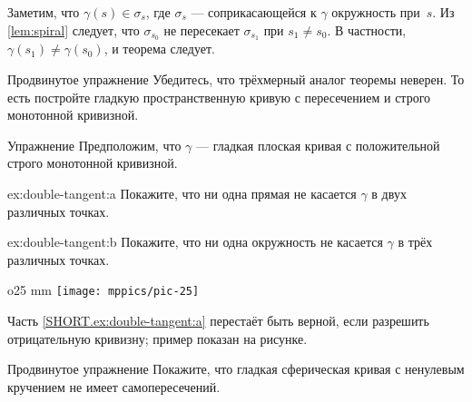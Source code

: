 Заметим, что $\gamma(s)\in \sigma_s$, где  $\sigma_s$ --- соприкасающейся к $\gamma$ окружность при~$s$.
Из \ref{lem:spiral} следует, что $\sigma_{s_0}$ не пересекает $\sigma_{s_1}$ при $s_1\ne s_0$.
В частности, $\gamma(s_1)\ne \gamma(s_0)$, и теорема следует.
\qeds

{\sloppy

\begin{thm}{Продвинутое упражнение}\label{ex:3D-spiral}
Убедитесь, что трёхмерный аналог теоремы неверен.
То есть постройте гладкую пространственную кривую с пересечением и строго монотонной кривизной.
\end{thm}

}

\begin{thm}{Упражнение}\label{ex:double-tangent}
Предположим, что $\gamma$ --- гладкая плоская кривая с положительной строго монотонной кривизной.

\begin{subthm}{ex:double-tangent:a}
Покажите, что ни одна прямая не касается $\gamma$ в двух различных точках.
\end{subthm}

\begin{subthm}{ex:double-tangent:b}
Покажите, что ни одна окружность не касается $\gamma$ в трёх различных точках.
\end{subthm}

\end{thm}

{

\begin{wrapfigure}{o}{25 mm}
\vskip-4mm
\centering
\texttt{[image: mppics/pic-25]}
\vskip0mm
\end{wrapfigure}

Часть \ref{SHORT.ex:double-tangent:a} перестаёт быть верной, если разрешить отрицательную кривизну; пример показан на рисунке.

}

\begin{thm}{Продвинутое упражнение}\label{ex:spherical-spiral}
Покажите, что гладкая сферическая кривая с ненулевым кручением не имеет самопересечений.
\end{thm}



